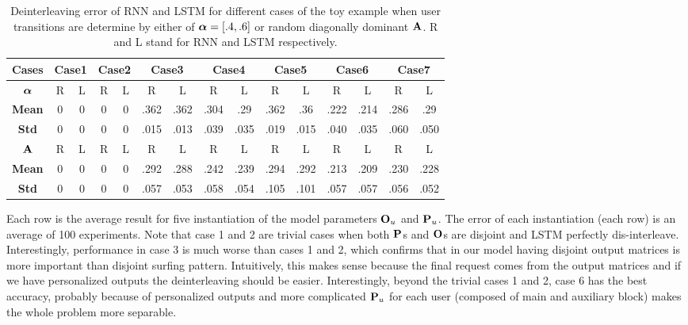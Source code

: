 \documentclass[conference]{IEEEtran}
\begin{document}
	\begin{table}
		\scriptsize  
		\centering
		\begin{tabular}{|c|c|c|c|c|c|c|c|c|c|c|c|c|c|c|}
			\hline
			{\bf \footnotesize Cases} & \multicolumn{2}{c|}{\bf \footnotesize  Case1} & \multicolumn{2}{c|}{\bf \footnotesize  Case2} & \multicolumn{2}{c|}{\bf \footnotesize  Case3} & \multicolumn{2}{c|}{\bf \footnotesize  Case4} & \multicolumn{2}{c|}{\bf \footnotesize  Case5} & \multicolumn{2}{c|}{\bf \footnotesize Case6} & \multicolumn{2}{c|}{\bf \footnotesize  Case7}  \\ 
			\hline  
			{\bf $\aalpha$} 		
			&  R 	& L  	&  R	& L 	&  	R 		& L  &  R  & L  & R  	& L 	&  R  	& L 	&  R 	& L \\ \hline 			
			{\bf \footnotesize  Mean} 		
			&  0 	& 0		&  0 	& 0		& 	.362 	& .362	& .304 & .29	& .362 &  .36	& .222 &  .214& .286 & .29 \\ \hline 
			{\bf \footnotesize  Std} 	
			&  0 	& 0		&  0 	& 0		& 	.015 	& .013	& .039 & .035	& .019 &  .015& .040 &  .035& .060 &  .050\\ \hline 
			\hline  
			{\bf $\A$} 		
			&  R 	& L  	&  R	& L 	&  	R 		& L  &  R  & L  & R  	& L 	&  R  	& L 	&  R 	& L \\ \hline 			
			{\bf \footnotesize  Mean} 		
			&  0 	& 0		&  0 	& 0		& 	.292 	& .288	& .242 & .239	& .294 &  .292	& .213 &  .209 & .230 & .228 \\ \hline 
			{\bf \footnotesize  Std} 	
			&  0 	& 0		&  0 	& 0		& 	.057 	& .053	& .058 & .054	& .105 &  .101 & .057 &  .057 & .056 & .052  \\ \hline 
		\end{tabular}
		\caption{Deinterleaving error of RNN and LSTM for different cases of the toy example when user transitions are determine by either of $\aalpha = [.4, .6]$ or random diagonally dominant $\A$. R and L stand for RNN and LSTM respectively.}
		\label{tab:as}
	\end{table}
	
	Each row is the average result for five instantiation of the model parameters $\O_u$ and $\P_u$. 
	The error of each instantiation (each row) is an average of 100 experiments. 
	Note that case 1 and 2 are trivial cases when both $\P$s and $\O$s are disjoint and LSTM perfectly dis-interleave. 
	Interestingly, performance in case 3 is much worse than cases 1 and 2, which confirms that in our model having disjoint output matrices is more important than disjoint surfing pattern. 
	Intuitively, this makes sense because the final request comes from the output matrices and if we have personalized outputs the deinterleaving should be easier. 
	Interestingly, beyond the trivial cases 1 and 2, case 6 has the best accuracy, probably because of personalized outputs and more complicated $\P_u$ for each user (composed of main and auxiliary block) makes the whole problem more separable. 
	
\end{document}
